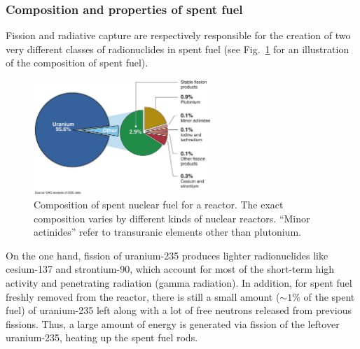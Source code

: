 \documentclass[nofootinbib,preprint,aps]{revtex4-1}
\begin{document}
        \subsubsection{Composition and properties of spent fuel}
        Fission and radiative capture are respectively responsible for the creation of two very
        different classes of radionuclides in spent fuel
        (see Fig.~\ref{fig:spentfuel} for an illustration of the composition of spent fuel).
        \begin{figure}
            \centering
            \includegraphics[width=0.6\textwidth]{spent-fuel.png}
            \caption{Composition of spent nuclear fuel for a reactor. The exact composition varies
            by different kinds of nuclear reactors. ``Minor actinides'' refer to transuranic elements other than plutonium.\cite{gao}}
            \label{fig:spentfuel}
        \end{figure}

        On the one hand, fission of uranium-235 produces lighter radionuclides like cesium-137 and strontium-90, which
        account for most of the short-term high activity and penetrating radiation (gamma radiation).
        In addition, for spent fuel freshly removed from the reactor, there is still a small amount ($\sim 1\%$ of
        the spent fuel)
        of uranium-235 left along with a lot of free neutrons released from previous fissions. Thus, a large amount
        of energy is generated via fission of the leftover uranium-235, heating up the spent fuel rods.
\end{document}
